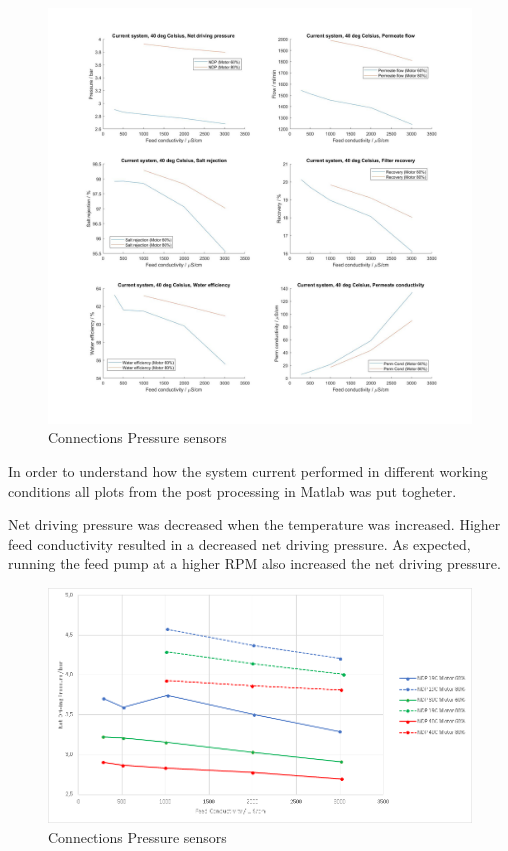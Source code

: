 \begin{figure}[H]
    \centering
    \includegraphics[width=1.1\textwidth]{Key40}
    \caption{Connections Pressure sensors}
    \label{fig:PressConn}
\end{figure}

\newpage

In order to understand how the system current performed in different working conditions all plots from the post processing in Matlab was put togheter. 

Net driving pressure was decreased when the temperature was increased. Higher feed conductivity resulted in a decreased net driving pressure. As expected, running the feed pump at a higher RPM also increased the net driving pressure.



\begin{figure}[H]
    \centering
    \includegraphics[width=1.1\textwidth]{NDP}
    \caption{Connections Pressure sensors}
    \label{fig:PressConn}
\end{figure}



